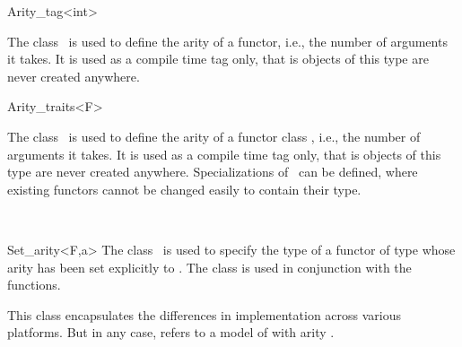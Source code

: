\begin{ccRefClass}{Arity_tag<int>}
  
  \ccDefinition The class \ccRefName\ is used to define the arity of a
  functor, i.e., the number of arguments it takes. It is used as a
  compile time tag only, that is objects of this type are never
  created anywhere.


  \ccSeeAlso

\end{ccRefClass}

\begin{ccRefClass}{Arity_traits<F>}
  
  \ccDefinition The class \ccRefName\ is used to define the arity of a
  functor class , i.e., the number of arguments it takes. It is
  used as a compile time tag only, that is objects of this type are
  never created anywhere. Specializations of \ccRefName\ can be
  defined, where existing functors cannot be changed easily to contain
  their  type.



  \ccSeeAlso
  \\

\end{ccRefClass}

\begin{ccRefClass}{Set_arity<F,a>}
  \ccDefinition The class \ccRefName\ is used to specify the type of a
  functor of type  whose arity has been set explicitly to
  . The class is used in conjunction with the 
  functions.

  
  \ccTypes
  
   This class encapsulates the differences in
  implementation across various platforms. But in any case, 
  refers to a model of  with arity .

  \ccSeeAlso
  \\
  \\
  \\
  \\
  \\
  \\ 
  
\end{ccRefClass}

